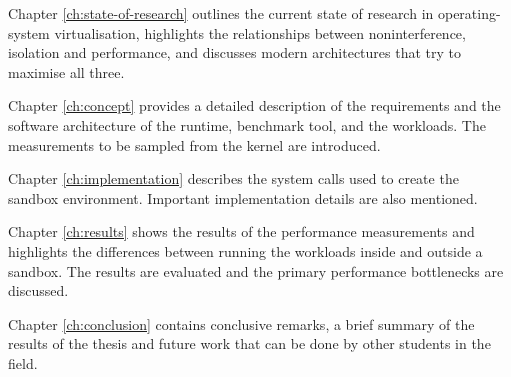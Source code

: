 Chapter \ref{ch:state-of-research} outlines the current state of research in operating-system 
virtualisation, highlights the relationships between noninterference, isolation and performance, and
discusses modern architectures that try to maximise all three.     

Chapter \ref{ch:concept} provides a detailed description of the requirements and the software architecture 
of the runtime, benchmark tool, and the workloads. The measurements to be sampled from the kernel are introduced.

Chapter \ref{ch:implementation} describes the system calls used to create the sandbox environment.
Important implementation details are also mentioned.

Chapter \ref{ch:results} shows the results of the performance measurements and highlights the 
differences between running the workloads inside and outside a sandbox. The results are evaluated 
and the primary performance bottlenecks are discussed.

Chapter \ref{ch:conclusion} contains conclusive remarks, a brief summary of the results of the thesis
and future work that can be done by other students in the field. 